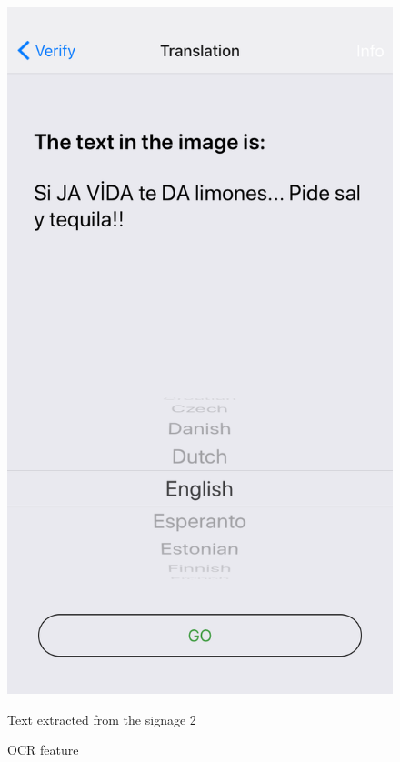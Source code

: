 \documentclass[12pt]{article}
\begin{document}
\begin{figure} [H]
\begin{minipage}{.5\textwidth}
  \includegraphics[width=0.9\linewidth]{media/case4a.png}
  \caption{OCR feature}{Text extracted from the signage 2}
  \label{fig:case4}
\end{minipage}
\end{figure}
\end{document}
